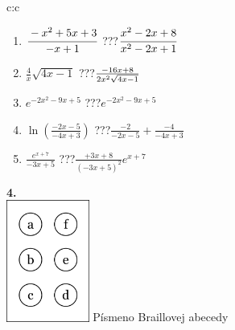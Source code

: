 \documentclass[10pt]{report}
\begin{document}
\begin{tabular}{c:c}
\begin{minipage}[c][104.5mm][t]{0.5\linewidth}
\begin{center}
\begin{minipage}{0.79\linewidth}
\begin{center}
\begin{varwidth}{\linewidth}
\begin{enumerate}
\item $\cfrac{-x^2+5x+3}{-x+1}$\quad \dotfill\; ???\;\dotfill \quad $\cfrac{x^2-2x+8}{x^2-2x+1}$
\item $\frac{4}{x}\sqrt{4x-1}$\quad \dotfill\; ???\;\dotfill \quad $\frac{-16x+8}{2x^2 \sqrt{\smash[b]{4x-1}}}$
\item $e^{-2x^2-9x+5}$\quad \dotfill\; ???\;\dotfill \quad $e^{-2x^2-9x+5}$
\item $\ln{\left(\frac{-2x-5}{-4x+3}\right)}$\quad \dotfill\; ???\;\dotfill \quad $\frac{-2}{-2x-5}+\frac{-4}{-4x+3}$
\item $\frac{e^{x+7}}{-3x+5}$\quad \dotfill\; ???\;\dotfill \quad $\frac{+3x+8}{(-3x+5)^2}e^{x+7}$
\end{enumerate}
\end{varwidth}
\end{center}
\end{minipage}
\begin{minipage}{0.20\linewidth}
\begin{center}
{\Huge\bfseries 4.} \\[2mm]
\includegraphics[height=40mm]{../images/braille.png}
{\small Písmeno Braillovej abecedy}
\end{center}
\end{minipage}
\end{center}
\end{minipage}
%
\end{tabular}
\newpage
\thispagestyle{empty}
\end{document}
